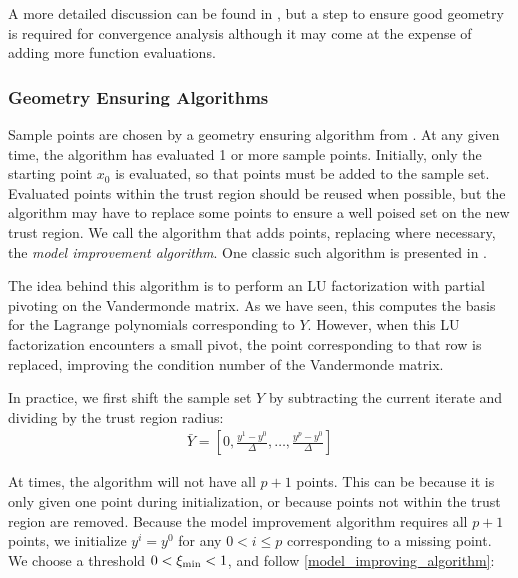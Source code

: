 A more detailed discussion can be found in \cite{doi:10.1080/10556780802409296}, but a step to ensure good geometry is required for convergence analysis although it may come at the expense of adding more function evaluations.

\subsubsection{Geometry Ensuring Algorithms}

Sample points are chosen by a geometry ensuring algorithm from \cite{DUMMY:intro_book}.
At any given time, the algorithm has evaluated 1 or more sample points.
Initially, only the starting point $x_0$ is evaluated, so that points must be added to the sample set.
Evaluated points within the trust region should be reused when possible, but the algorithm may have to replace some points to ensure a well poised set on the new trust region.
We call the algorithm that adds points, replacing where necessary, the \emph{model improvement algorithm}.
One classic such algorithm is presented in \cite{DUMMY:intro_book}.

The idea behind this algorithm is to perform an LU factorization with partial pivoting on the Vandermonde matrix.
As we have seen, this computes the basis for the Lagrange polynomials corresponding to $Y$.
However, when this LU factorization encounters a small pivot, the point corresponding to that row is replaced, improving the condition number of the Vandermonde matrix.

In practice, we first shift the sample set $Y$ by subtracting the current iterate and dividing by the trust region radius:
\begin{align}
\bar{Y} = [0, \frac{y^1 - y^0}{\Delta}, \ldots, \frac{y^p - y^0}{\Delta}]
\end{align}

At times, the algorithm will not have all $p+1$ points.
This can be because it is only given one point during initialization, or because points not within the trust region are removed.
Because the model improvement algorithm requires all $p+1$ points, we initialize $y^i = y^0$ for any $0 < i \le p$ corresponding to a missing point.
We choose a threshold $0 < \xi_{\text{min}} < 1$, and follow \cref{model_improving_algorithm}:


